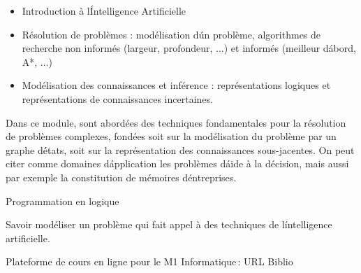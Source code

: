 \vfill


{
\begin{itemize}
\item Introduction à l\'Intelligence Artificielle
\item Résolution de problèmes : modélisation d\'un problème, algorithmes de recherche non informés (largeur, profondeur, ...) et informés (meilleur d\'abord, A*, ...) 
\item Modélisation des connaissances et inférence : représentations logiques et représentations de connaissances incertaines.
\end{itemize}
Dans ce module, sont abordées des techniques fondamentales pour la résolution de problèmes complexes, fondées soit sur la modélisation  du problème par un graphe d\'états,
soit sur la représentation des connaissances sous-jacentes. On peut citer comme domaines d\'application les problèmes d\'aide à la décision,
mais aussi par exemple la  constitution de mémoires d\'entreprises.
} 
{Programmation en logique 
} 
{
\begin{itemize}
\ObjItem Savoir modéliser un problème qui fait appel à des techniques de l\'intelligence artificielle.
\end{itemize}
} 
{Plateforme de cours en ligne pour le M1 Informatique\,: URL} 
{Biblio} 
 
\vfill

